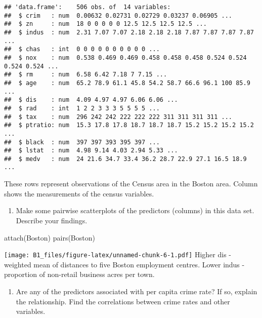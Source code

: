 \documentclass[
]{article}
\newenvironment{Shaded}{\begin{snugshade}}{\end{snugshade}}
\newcommand{\FunctionTok}[1]{\textcolor[rgb]{0.00,0.00,0.00}{#1}}
\newcommand{\NormalTok}[1]{#1}
\providecommand{\tightlist}{%
  \setlength{\itemsep}{0pt}\setlength{\parskip}{0pt}}
\begin{document}
\begin{verbatim}
## 'data.frame':    506 obs. of  14 variables:
##  $ crim   : num  0.00632 0.02731 0.02729 0.03237 0.06905 ...
##  $ zn     : num  18 0 0 0 0 0 12.5 12.5 12.5 12.5 ...
##  $ indus  : num  2.31 7.07 7.07 2.18 2.18 2.18 7.87 7.87 7.87 7.87 ...
##  $ chas   : int  0 0 0 0 0 0 0 0 0 0 ...
##  $ nox    : num  0.538 0.469 0.469 0.458 0.458 0.458 0.524 0.524 0.524 0.524 ...
##  $ rm     : num  6.58 6.42 7.18 7 7.15 ...
##  $ age    : num  65.2 78.9 61.1 45.8 54.2 58.7 66.6 96.1 100 85.9 ...
##  $ dis    : num  4.09 4.97 4.97 6.06 6.06 ...
##  $ rad    : int  1 2 2 3 3 3 5 5 5 5 ...
##  $ tax    : num  296 242 242 222 222 222 311 311 311 311 ...
##  $ ptratio: num  15.3 17.8 17.8 18.7 18.7 18.7 15.2 15.2 15.2 15.2 ...
##  $ black  : num  397 397 393 395 397 ...
##  $ lstat  : num  4.98 9.14 4.03 2.94 5.33 ...
##  $ medv   : num  24 21.6 34.7 33.4 36.2 28.7 22.9 27.1 16.5 18.9 ...
\end{verbatim}

These rows represent observations of the Census area in the Boston area.
Column shows the measurements of the census variables.

\begin{enumerate}
\def\labelenumi{(\alph{enumi})}
\setcounter{enumi}{1}
\tightlist
\item
  Make some pairwise scatterplots of the predictors (columns) in this
  data set. Describe your findings.
\end{enumerate}

\begin{Shaded}
\begin{Highlighting}[]
\FunctionTok{attach}\NormalTok{(Boston)}
\FunctionTok{pairs}\NormalTok{(Boston)}
\end{Highlighting}
\end{Shaded}

\texttt{[image: B1\_files/figure-latex/unnamed-chunk-6-1.pdf]} Higher dis
- weighted mean of distances to five Boston employment centres. Lower
indus - proportion of non-retail business acres per town.

\begin{enumerate}
\def\labelenumi{(\alph{enumi})}
\setcounter{enumi}{2}
\tightlist
\item
  Are any of the predictors associated with per capita crime rate? If
  so, explain the relationship. Find the correlations between crime
  rates and other variables.
\end{enumerate}
\end{document}
